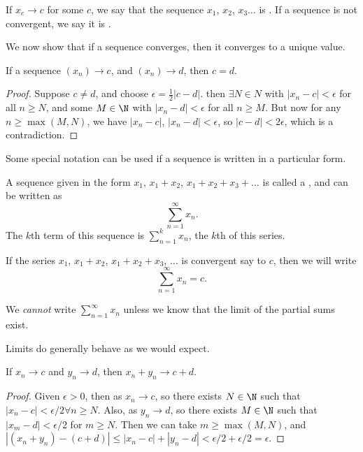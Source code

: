 \documentclass[a4paper]{scrartcl}
\begin{document}
\begin{definition}
If $x_c \rightarrow c$ for some $c$, we say that the sequence $x_1$, $x_2$, $x_3 \dots$ is . If a sequence is not convergent, we say it is .
\end{definition}

We now show that if a sequence converges, then it converges to a unique value.

\begin{proposition}
If a sequence $(x_n) \rightarrow c$, and $(x_n) \rightarrow d$, then $c = d$.
\end{proposition}
\begin{proof}
	Suppose $c \neq d$, and choose $\epsilon = \frac{1}{2}|c - d|$. then $\exists N \in N$ with $|x_n - c| < \epsilon$ for all $n \geq N$, and some $M \in \N$ with $|x_n - d| < \epsilon$ for all $n \geq M$. But now for any $n \geq \max(M, N)$, we have $|x_n - c|$, $|x_n - d| < \epsilon$, so $|c - d| < 2 \epsilon$, which is a contradiction.
\end{proof}

Some special notation can be used if a sequence is written in a particular form.

\begin{definition}[Series]
	A sequence given in the form $x_1$, $x_1 + x_2$, $x_1 + x_2 + x_3 + \dots$ is called a , and can be written as
	$$
\sum_{n = 1}^\infty x_n.
	$$
	The $k$th term of this sequence is $\sum_{n = 1}^k x_n$, the $k$th  of this series.
\end{definition}

If the series $x_1$, $x_1 + x_2$, $x_1 + x_2 + x_3$, $\dots$ is convergent say to $c$, then we will write
$$
\sum_{n = 1}^{\infty} x_n = c.
$$
\begin{remark}[Warning]
	We \emph{cannot} write $\sum_{n = 1}^{\infty}x_n$ unless we know that the limit of the partial sums exist.
\end{remark}


Limits do generally behave as we would expect.

\begin{proposition}
	If $x_n \rightarrow c$ and $y_n \rightarrow d$, then $x_n + y_n \rightarrow c + d$.
\end{proposition}
\begin{proof}
	Given $\epsilon > 0$, then as $x_n \rightarrow c$, so there exists $N \in \N$ such that $|x_n - c| < \epsilon / 2 \forall n \geq N$. Also, as $y_n \rightarrow d$, so there exists $M \in \N$ such that $|x_m - d| < \epsilon / 2$ for $m \geq N$. Then we can take $m \geq \max(M, N)$, and $|(x_n + y_n) - (c + d)| \leq |x_n - c| + |y_n - d| < \epsilon/2 + \epsilon/2 = \epsilon$.
\end{proof}
\end{document}
